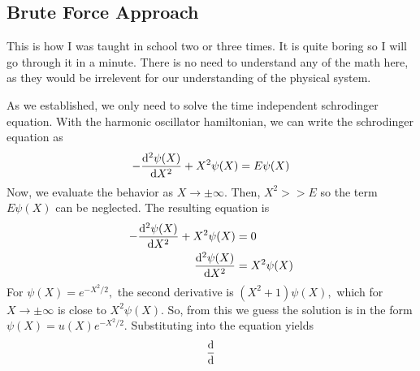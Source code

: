 \subsection{Brute Force Approach}
\begin{script}
    This is how I was taught in school two or three times. It is quite boring so I will go through it in a minute. There is no need to understand any of the math here, as they would be irrelevent for our understanding of the physical system. 
\end{script}
As we established, we only need to solve the time independent schrodinger equation. With the harmonic oscillator hamiltonian, we can write the schrodinger equation as
\begin{align}
    -\derivative{^2\psi(X)}{X^2}+X^2\psi(X)=E\psi(X)
\end{align}
Now, we evaluate the behavior as \(X\to\pm\infty.\) Then, \(X^2>>E\) so the term \(E\psi(X)\) can be neglected. The resulting equation is
\begin{align}
    -\derivative{^2\psi(X)}{X^2}+X^2\psi(X)&=0\\
    \derivative{^2\psi(X)}{X^2}&=X^2\psi(X)
\end{align}
For \(\psi(X)=e^{-X^2/2},\) the second derivative is \((X^2+1)\psi(X),\) which for \(X\to\pm\infty\) is close to \(X^2\psi(X)\). So, from this we guess the solution is in the form \(\psi(X)=u(X)e^{-X^2/2}\). Substituting into the equation yields
\begin{align}
    \derivative{}{}
\end{align}